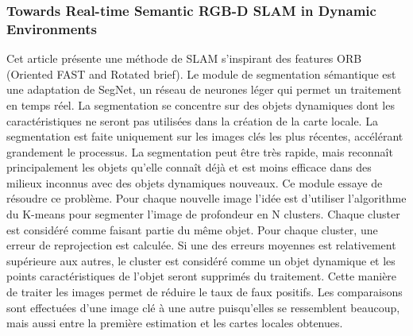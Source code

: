 \documentclass[11pt]{article}
\begin{document}
        \subsubsection{Towards Real-time Semantic RGB-D SLAM in Dynamic Environments} 
          Cet article \cite{jiRealtimeSemanticRGBD2021} présente une méthode de SLAM s'inspirant des features ORB (Oriented FAST and Rotated \acrshort{brief}).
          Le module de segmentation sémantique est une adaptation de SegNet, un réseau de neurones léger qui permet un traitement en temps réel.
          La segmentation se concentre sur des objets dynamiques dont les caractéristiques ne seront pas utilisées dans la création de 
          la carte locale. La segmentation est faite uniquement sur les images clés les plus récentes, accélérant grandement le processus.
          La segmentation peut être très rapide, mais reconnaît principalement les objets qu'elle connaît déjà et est moins efficace dans des 
          milieux inconnus avec des objets dynamiques nouveaux. Ce module essaye de résoudre ce problème.
          Pour chaque nouvelle image l'idée est d'utiliser l'algorithme du K-means pour segmenter l'image de profondeur en N clusters.
          Chaque cluster est considéré comme faisant partie du même objet. Pour chaque cluster, une erreur de reprojection est calculée. Si une 
          des erreurs moyennes est relativement supérieure aux autres, le cluster est considéré comme un objet dynamique et les points caractéristiques
          de l'objet seront supprimés du traitement. Cette manière de traiter les images permet de réduire le taux de faux positifs. 
          Les comparaisons sont effectuées d'une image clé à une autre puisqu'elles se ressemblent beaucoup, mais aussi entre la première estimation
          et les cartes locales obtenues.

        \pagebreak
\end{document}
